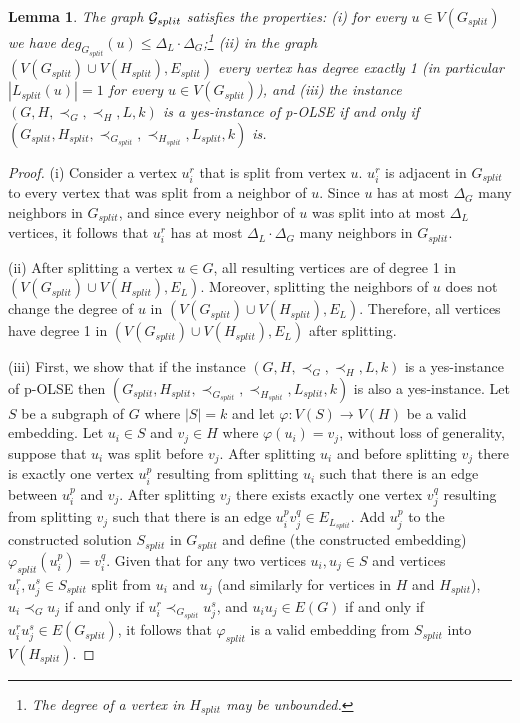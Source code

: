 \documentclass[11pt]{article}
\newtheorem{lemma}[theorem]{Lemma}
\let\phi=\varphi
\begin{document}
\begin{lemma}
\label{lem:splitting}
The graph ${\cal G}_{split}$ satisfies the properties: (i) for every $u \in V(G_{split})$ we have $deg_{G_{split}}(u) \leq \Delta_L \cdot \Delta_G$;\footnote{The degree of a vertex in $H_{split}$ may be unbounded.} (ii) in the graph $(V(G_{split}) \cup V(H_{split}), E_{split})$ every vertex has degree exactly 1 (in particular $|L_{split}(u)| =1$ for every $u \in V(G_{split})$), and (iii) the instance $(G, H, \prec_G, \prec_H, L, k)$ is a yes-instance of p-OLSE if and only if $(G_{split}, H_{split}, \prec_{G_{split}}, \prec_{H_{split}}, L_{split}, k)$ is.
\end{lemma}

\begin{proof}
(i) Consider a vertex $u^r_i$ that is split from vertex $u$. $u^r_i$ is adjacent in $G_{split}$ to every vertex that was split from a neighbor of $u$.  Since $u$ has at most $\Delta_G$ many neighbors in $G_{split}$, and since every neighbor of $u$ was split into at most $\Delta_L$ vertices, it follows that $u^r_i$ has at most $\Delta_L \cdot \Delta_G$ many neighbors in $G_{split}$.

(ii) After splitting a vertex $u \in G$, all resulting vertices are of degree 1 in $(V(G_{split}) \cup V(H_{split}), E_L)$.  Moreover,  splitting the neighbors of $u$ does not change the degree of $u$ in $(V(G_{split}) \cup V(H_{split}), E_L)$.  Therefore, all vertices have degree 1 in $(V(G_{split}) \cup V(H_{split}), E_L)$ after splitting.

(iii) First, we show that if the instance $(G, H, \prec_G, \prec_H, L, k)$ is a yes-instance of p-OLSE then $(G_{split}, H_{split}, \prec_{G_{split}}, \prec_{H_{split}}, L_{split}, k)$ is also a yes-instance.  Let $S$ be a subgraph of $G$ where $|S| = k$ and let $\phi : V(S) \to V(H)$ be a valid embedding.  Let $u_i \in S$ and $v_j \in H$ where $\phi(u_i) = v_j$, without loss of generality, suppose that $u_i$ was split before $v_j$.  After splitting $u_i$ and before splitting $v_j$ there is exactly one vertex $u_i^p$ resulting from splitting $u_i$ such that there is an edge between $u_i^p$ and $v_j$.  After splitting $v_j$ there exists exactly one vertex $v_j^q$ resulting from splitting $v_j$ such that there is an edge $u_i^pv_j^q \in E_{L_{split}}$.  Add $u_j^p$ to the constructed solution $S_{split}$ in  $G_{split}$ and define (the constructed embedding) $\phi_{split}(u_i^p) = v_i^q$.  Given that for any two vertices $u_i, u_j \in S$ and vertices $u_i^r, u_j^s \in S_{split}$ split from $u_i$ and $u_j$ (and similarly for vertices in $H$ and $H_{split}$), $u_i \prec_G u_j$ if and only if $u_i^r \prec_{G_{split}} u_j^s$, and $u_iu_j \in E(G)$ if and only if $u_i^ru_j^s \in E(G_{split})$, it follows that $\phi_{split}$ is a valid embedding from $S_{split}$ into $V(H_{split})$.


\end{proof}
\end{document}
